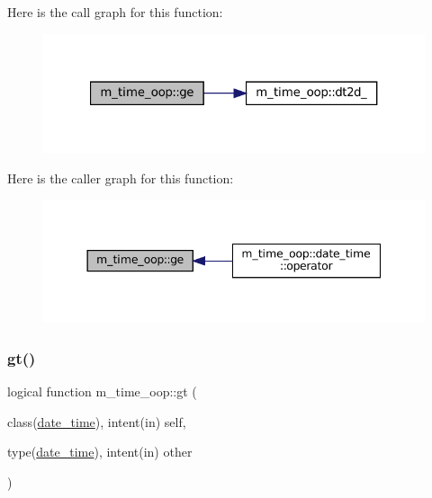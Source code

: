 Here is the call graph for this function\+:\nopagebreak
\begin{figure}[H]
\begin{center}
\leavevmode
\includegraphics[width=321pt]{namespacem__time__oop_aeea1131ab511b897168f00a908b75458_cgraph}
\end{center}
\end{figure}
Here is the caller graph for this function\+:\nopagebreak
\begin{figure}[H]
\begin{center}
\leavevmode
\includegraphics[width=344pt]{namespacem__time__oop_aeea1131ab511b897168f00a908b75458_icgraph}
\end{center}
\end{figure}
\mbox{\label{namespacem__time__oop_a753692f18b6cd100401603d0b88d7c3c}} 
\subsubsection{\texorpdfstring{gt()}{gt()}}
{\footnotesize\ttfamily logical function m\+\_\+time\+\_\+oop\+::gt (\begin{DoxyParamCaption}\item[{class(\mbox{\hyperlink{structm__time__oop_1_1date__time}{date\+\_\+time}}), intent(in)}]{self,  }\item[{type(\mbox{\hyperlink{structm__time__oop_1_1date__time}{date\+\_\+time}}), intent(in)}]{other }\end{DoxyParamCaption})\hspace{0.3cm}{\ttfamily [private]}}



